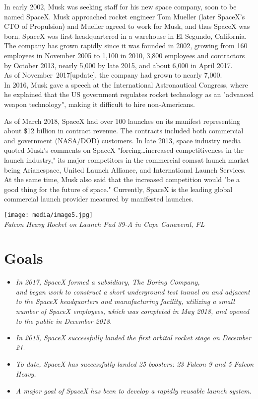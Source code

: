 In early 2002, Musk was seeking staff for his new space company, soon to
be named SpaceX. Musk approached rocket engineer Tom Mueller (later
SpaceX's CTO of Propulsion) and Mueller agreed to work for Musk, and
thus SpaceX was born. SpaceX was first headquartered in a warehouse in
El Segundo, California. The company has grown rapidly since it was
founded in 2002, growing from 160 employees in November 2005 to 1,100 in
2010, 3,800 employees and contractors by October 2013, nearly 5,000 by
late 2015, and about 6,000 in April 2017.\\
As of November~2017{[}update{]}, the company had grown to nearly
7,000.\\
In 2016, Musk gave a speech at the International Astronautical Congress,
where he explained that the US government regulates rocket technology as
an "advanced weapon technology", making it difficult to hire
non-Americans.

As of March 2018, SpaceX had over 100 launches on its manifest
representing about \$12 billion in contract revenue. The contracts
included both commercial and government (NASA/DOD) customers. In late
2013, space industry media quoted Musk's comments on SpaceX
"forcing\ldots{}increased competitiveness in the launch industry," its
major competitors in the commercial comsat launch market being
Arianespace, United Launch Alliance, and International Launch Services.
At the same time, Musk also said that the increased competition would
"be a good thing for the future of space." Currently, SpaceX is the
leading global commercial launch provider measured by manifested
launches.

\texttt{[image: media/image5.jpg]}\\
\emph{Falcon Heavy Rocket on Launch Pad 39-A in Cape Canaveral, FL}

\section{Goals}\label{goals}

\begin{itemize}
\item
  \emph{In 2017, SpaceX formed a subsidiary, The Boring Company,\\
  and began work to construct a short underground test tunnel on and
  adjacent to the SpaceX headquarters and manufacturing facility,
  utilizing a small number of SpaceX employees, which was completed in
  May 2018, and opened to the public in December 2018.}
\item
  \emph{In 2015, SpaceX successfully landed the first orbital rocket
  stage on December 21.}
\item
  \emph{To date, SpaceX has successfully landed 25 boosters: 23 Falcon 9
  and 5 Falcon Heavy.}
\item
  \emph{A major goal of SpaceX has been to develop a rapidly reusable
  launch system.}
\end{itemize}

